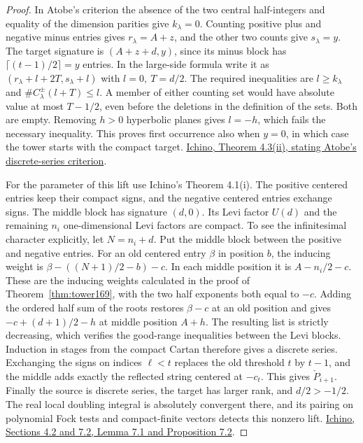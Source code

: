 \documentclass[a4paper,11pt]{article}
\theoremstyle{definition}
\theoremstyle{remark}
\numberwithin{equation}{section}
\begin{document}
\begin{proof}
In Atobe's criterion the absence of the two central half-integers
and equality of the dimension parities give \(k_\lambda=0\).
Counting positive plus and negative minus entries gives
\(r_\lambda=A+z\), and the other two counts give \(s_\lambda=y\).
The target signature is \((A+z+d,y)\), since its minus block has
\(\lceil(t-1)/2\rceil=y\) entries. In the large-side formula write it
as \((r_\lambda+l+2T,s_\lambda+l)\) with \(l=0,\ T=d/2\).
The required inequalities are \(l\ge k_\lambda\) and
\(\#C^\pm_\lambda(l+T)\le l\). A member of either counting set
would have absolute value at most \(T-1/2\), even before the
deletions in the definition of the sets. Both are empty.
Removing \(h>0\) hyperbolic planes gives \(l=-h\), which fails
the necessary inequality. This proves first occurrence also when
\(y=0\), in which case the tower starts with the compact target.
\href{https://arxiv.org/pdf/2002.09148}{Ichino, Theorem 4.3(ii),
stating Atobe's discrete-series criterion}.

For the parameter of this lift use Ichino's Theorem 4.1(i).
The positive centered entries keep their compact signs, and the
negative centered entries exchange signs. The middle block has
signature \((d,0)\). Its Levi factor \(U(d)\) and the remaining
\(n_i\) one-dimensional Levi factors are compact. To see the
infinitesimal character explicitly, let \(N=n_i+d\). Put the
middle block between the positive and negative entries. For an
old centered entry \(\beta\) in position \(b\), the inducing
weight is \(\beta-((N+1)/2-b)-c\). In each middle position it
is \(A-n_i/2-c\). These are the inducing weights calculated in
the proof of Theorem~\ref{thm:tower169}, with the two half
exponents both equal to \(-c\). Adding the ordered half sum of
the roots restores \(\beta-c\) at an old position and gives
\(-c+(d+1)/2-h\) at middle position \(A+h\). The resulting
list is strictly decreasing, which verifies the good-range
inequalities between the Levi blocks. Induction in stages from
the compact Cartan therefore gives a discrete series. Exchanging
the signs on indices \(\ell<t\) replaces the old threshold \(t\)
by \(t-1\), and the middle adds exactly the reflected string
centered at \(-c_t\). This gives \(\check P_{i+1}\).
Finally the source is discrete series, the target has larger
rank, and \(d/2>-1/2\). The real local doubling integral is
absolutely convergent there, and its pairing on polynomial
Fock tests and compact-finite vectors detects this nonzero
lift. \href{https://arxiv.org/pdf/2002.09148}{Ichino,
Sections 4.2 and 7.2, Lemma 7.1 and Proposition 7.2}.
\end{proof}
\end{document}
